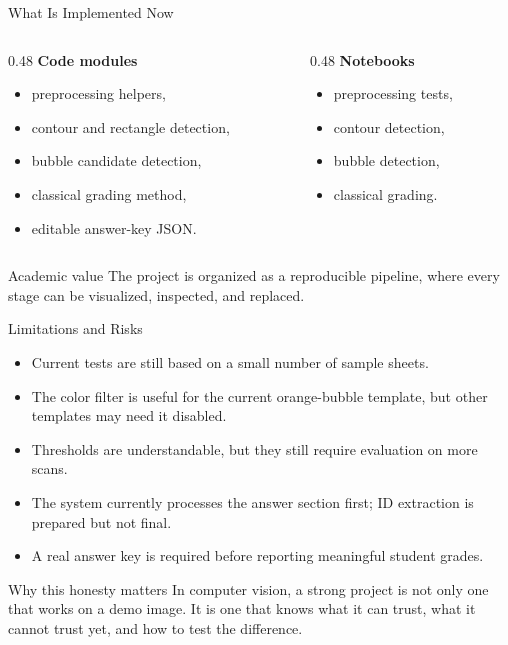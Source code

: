 \documentclass[aspectratio=169]{beamer}
\begin{document}
\begin{frame}{What Is Implemented Now}
  \begin{columns}[T]
    \begin{column}{0.48\textwidth}
      \textbf{Code modules}
      \begin{itemize}
        \item preprocessing helpers,
        \item contour and rectangle detection,
        \item bubble candidate detection,
        \item classical grading method,
        \item editable answer-key JSON.
      \end{itemize}
    \end{column}
    \begin{column}{0.48\textwidth}
      \textbf{Notebooks}
      \begin{itemize}
        \item preprocessing tests,
        \item contour detection,
        \item bubble detection,
        \item classical grading.
      \end{itemize}
    \end{column}
  \end{columns}

  \vspace{0.35cm}

  \begin{block}{Academic value}
    The project is organized as a reproducible pipeline, where every stage can be visualized, inspected, and replaced.
  \end{block}
\end{frame}

\begin{frame}{Limitations and Risks}
  \begin{itemize}
    \item Current tests are still based on a small number of sample sheets.
    \item The color filter is useful for the current orange-bubble template, but other templates may need it disabled.
    \item Thresholds are understandable, but they still require evaluation on more scans.
    \item The system currently processes the answer section first; ID extraction is prepared but not final.
    \item A real answer key is required before reporting meaningful student grades.
  \end{itemize}

  \vspace{0.3cm}

  \begin{block}{Why this honesty matters}
    In computer vision, a strong project is not only one that works on a demo image. It is one that knows what it can trust, what it cannot trust yet, and how to test the difference.
  \end{block}
\end{frame}
\end{document}
